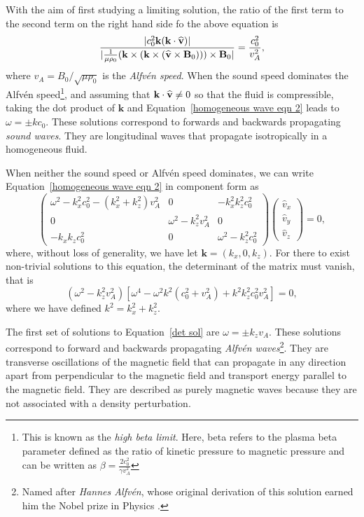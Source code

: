 With the aim of first studying a limiting solution, the ratio of the first term to the second term on the right hand side fo the above equation is
\begin{equation}
	\frac{|c_0^2\mathbf{k}(\mathbf{k}\cdot\widehat{\mathbf{v}})|}{|\frac{1}{\mu\rho_0}(\mathbf{k}\times(\mathbf{k}\times(\widehat{\mathbf{v}}\times\mathbf{B}_0)))\times\mathbf{B}_0|} = \frac{c_0^2}{v_A^2},
\end{equation}
where $v_A = B_0/\sqrt{\mu\rho_0}$ is the \textit{Alfv\'{e}n speed}. When the sound speed dominates the Alfv\'{e}n speed\footnote{This is known as the \textit{high beta limit}. Here, beta refers to the plasma beta parameter defined as the ratio of kinetic pressure to magnetic pressure and can be written as $\beta = \frac{2c_0^2}{\gamma v_A^2}$}, and assuming that $\mathbf{k}\cdot\widehat{\mathbf{v}} \neq 0$ so that the fluid is compressible, taking the dot product of $\mathbf{k}$ and Equation~\eqref{homogeneous wave eqn 2} leads to $\omega = \pm kc_0$. These solutions correspond to forwards and backwards propagating \textit{sound waves}. They are longitudinal waves that propagate isotropically in a homogeneous fluid.

When neither the sound speed or Alfv\'{e}n speed dominates, we can write Equation~\eqref{homogeneous wave eqn 2} in component form as
\begin{equation}
	\left(\begin{matrix}
		\omega^2 - k_x^2c_0^2 - (k_x^2 + k_z^2)v_A^2 & 0 & -k_x^2k_z^2c_0^2 \\
		0 & \omega^2 - k_z^2v_A^2 & 0 \\
		-k_xk_zc_0^2 & 0 & \omega^2 - k_z^2c_0^2
	\end{matrix}\right)
	\left(\begin{matrix}
		\widehat{v}_x \\
		\widehat{v}_y \\
		\widehat{v}_z
	\end{matrix} \right) = 0,
\end{equation}
where, without loss of generality, we have let $\mathbf{k} = (k_x, 0, k_z)$. For there to exist non-trivial solutions to this equation, the determinant of the matrix must vanish, that is
\begin{equation}
	(\omega^2 - k_z^2v_A^2)\left[\omega^4 - \omega^2k^2(c_0^2 + v_A^2) + k^2k_z^2c_0^2v_A^2 \right] = 0, \label{det sol}
\end{equation}
where we have defined $k^2 = k_x^2 + k_z^2$.

The first set of solutions to Equation~\eqref{det sol} are $\omega = \pm k_zv_A$. These solutions correspond to forward and backwards propagating \textit{Alfv\'{e}n waves}\footnote{Named after \textit{Hannes Alfv\'{e}n}, whose original derivation of this solution earned him the Nobel prize in Physics \citep{alf42}.}. They are transverse oscillations of the magnetic field that can propagate in any direction apart from perpendicular to the magnetic field and transport energy parallel to the magnetic field. They are described as purely magnetic waves because they are not associated with a density perturbation.

